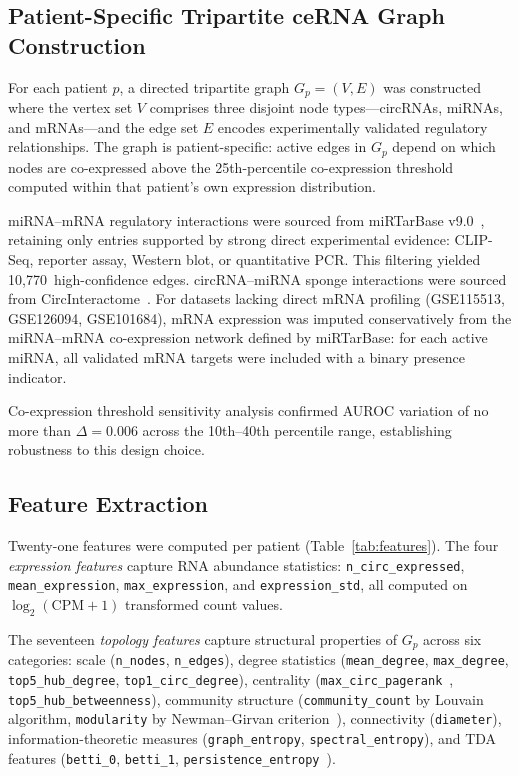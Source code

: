 \documentclass[12pt]{article}
\begin{document}
\subsection{Patient-Specific Tripartite ceRNA Graph Construction}

For each patient $p$, a directed tripartite graph
$G_p = (V, E)$ was constructed where the vertex set $V$ comprises
three disjoint node types---circRNAs, miRNAs, and mRNAs---and the
edge set $E$ encodes experimentally validated regulatory
relationships. The graph is patient-specific: active edges in $G_p$
depend on which nodes are co-expressed above the 25th-percentile
co-expression threshold computed within that patient's own expression
distribution.

miRNA--mRNA regulatory interactions were sourced from miRTarBase
v9.0~\citep{huang2022}, retaining only entries supported by strong
direct experimental evidence: CLIP-Seq, reporter assay, Western blot,
or quantitative PCR. This filtering yielded 10,770~high-confidence
edges. circRNA--miRNA sponge interactions were sourced from
CircInteractome~\citep{dudekula2016}. For datasets lacking direct mRNA
profiling (GSE115513, GSE126094, GSE101684), mRNA expression was
imputed conservatively from the miRNA--mRNA co-expression network
defined by miRTarBase: for each active miRNA, all validated mRNA
targets were included with a binary presence indicator.

Co-expression threshold sensitivity analysis confirmed AUROC variation
of no more than $\Delta=0.006$ across the 10th--40th percentile range,
establishing robustness to this design choice.

\subsection{Feature Extraction}

Twenty-one features were computed per patient (Table~\ref{tab:features}).
The four \emph{expression features} capture RNA abundance statistics:
\texttt{n\_circ\_expressed}, \texttt{mean\_expression},
\texttt{max\_expression}, and \texttt{expression\_std}, all computed on
$\log_2(\text{CPM}+1)$ transformed count values.

The seventeen \emph{topology features} capture structural properties of
$G_p$ across six categories: scale (\texttt{n\_nodes},
\texttt{n\_edges}), degree statistics (\texttt{mean\_degree},
\texttt{max\_degree}, \texttt{top5\_hub\_degree},
\texttt{top1\_circ\_degree}), centrality
(\texttt{max\_circ\_pagerank}~\citep{kolaczyk2009},
\texttt{top5\_hub\_betweenness}), community structure
(\texttt{community\_count} by Louvain algorithm,
\texttt{modularity} by Newman--Girvan criterion~\citep{newman2006}),
connectivity (\texttt{diameter}), information-theoretic measures
(\texttt{graph\_entropy}, \texttt{spectral\_entropy}), and TDA
features (\texttt{betti\_0}, \texttt{betti\_1},
\texttt{persistence\_entropy}~\citep{otter2017}).
\end{document}
